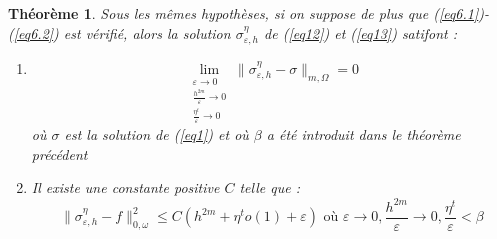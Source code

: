 \documentclass{article}
\newtheorem{theorem}{Théorème}[subsection]
\begin{document}
\begin{theorem}
Sous les mêmes hypothèses, si on suppose de plus que (\ref{eq6.1})-(\ref{eq6.2}) est vérifié, alors la solution $\sigma_{\varepsilon,h}^\eta$ de (\ref{eq12}) et (\ref{eq13}) satifont :
\begin{enumerate}
	\item \[\lim_{\substack{\varepsilon\to 0\\ \frac{h^{2m}}{\varepsilon}\to 0 \\ \frac{\eta^t}{\varepsilon}\to 0}} \|\sigma^\eta_{\varepsilon, h}-\sigma\|_{m,\Omega}=0\]
où $\sigma$ est la solution de (\ref{eq1}) et où $\beta$ a été introduit dans le théorème précédent
	\item Il existe une constante positive $C$ telle que :
		\[\|\sigma_{\varepsilon, h}^\eta - f\|_{0,\omega}^2\leq C\left(h^{2m}+\eta^t o(1)+\varepsilon\right) \text{ où } \varepsilon\to 0, \frac{h^{2m}}{\varepsilon}\to 0, \frac{\eta^t}{\varepsilon}<\beta\]
\end{enumerate}
\end{theorem}
\end{document}
